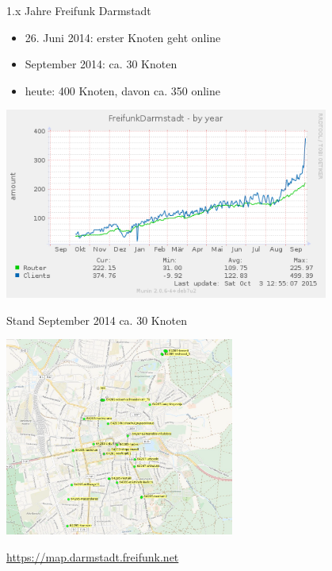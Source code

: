 \documentclass[10pt]{beamer}
\begin{document}
    \begin{frame}{1.x Jahre Freifunk Darmstadt}
      \vfill
      \begin{itemize}
        \item 26. Juni 2014: erster Knoten geht online
        \item September 2014: ca. 30 Knoten
        \item heute: 400 Knoten, davon ca. 350 online

      \end{itemize}
      \begin{center}
        \includegraphics[width=0.8\textwidth]{images/ffda-Okt14-15}
      \end{center}
    \end{frame}

    \begin{frame}{Stand September 2014}
      ca. 30 Knoten
      \begin{center}
        \vfill
        \begin{center}
          \includegraphics[height=6.5cm]{images/darmstadt-map}
        \end{center}
        \vfill
        \url{https://map.darmstadt.freifunk.net}
      \end{center}
    \end{frame}
\end{document}
